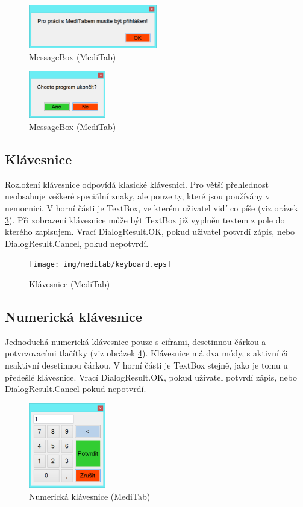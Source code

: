 \begin{figure}[H]
	\centering
	\includegraphics[width=0.5\textwidth]{img/meditab/bmb1.eps}
	\caption{MessageBox (MediTab)}
  \label{fig:bmb1}
\end{figure}

\begin{figure}[H]
	\centering
	\includegraphics[width=0.3\textwidth]{img/meditab/bmb2.eps}
	\caption{MessageBox (MediTab)}
  \label{fig:bmb2}
\end{figure}

\subsection{Klávesnice}

Rozložení klávesnice odpovídá klasické klávesnici. Pro větší přehlednost neobsahuje veškeré speciální znaky, ale pouze ty, které jsou používány v nemocnici. V horní části je TextBox, ve kterém uživatel vidí co píše (viz orázek \ref{fig:keyboard}). Při zobrazení klávesnice může být TextBox již vyplněn textem z pole do kterého zapisujem. Vrací DialogResult.OK, pokud uživatel potvrdí zápis, nebo DialogResult.Cancel, pokud nepotvrdí.

\begin{figure}[H]
	\centering
	\texttt{[image: img/meditab/keyboard.eps]}
	\caption{Klávesnice (MediTab)}
  \label{fig:keyboard}
\end{figure}

\subsection{Numerická klávesnice}

Jednoduchá numerická klávesnice pouze s ciframi, desetinnou čárkou a potvrzovacími tlačítky (viz obrázek \ref{fig:keyboard_num}). Klávesnice má dva módy, s aktivní či neaktivní desetinnou čárkou. V horní části je TextBox stejně, jako je tomu u předešlé klávesnice. Vrací DialogResult.OK, pokud uživatel potvrdí zápis, nebo DialogResult.Cancel pokud nepotvrdí.

\begin{figure}[H]
	\centering
	\includegraphics[width=0.3\textwidth]{img/meditab/keyboard_numeric.eps}
	\caption{Numerická klávesnice (MediTab)}
  \label{fig:keyboard_num}
\end{figure}